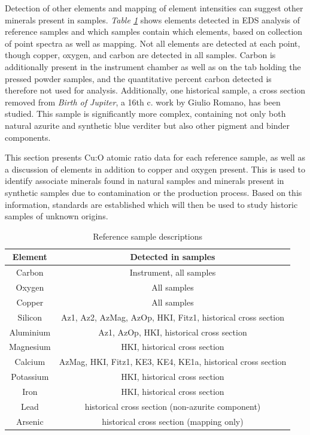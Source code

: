 Detection of other elements and mapping of element intensities can suggest other minerals present in samples. \textit{Table \ref{table:eds_elems}} shows elements detected in EDS analysis of reference samples and which samples contain which elements, based on collection of point spectra as well as mapping. Not all elements are detected at each point, though copper, oxygen, and carbon are detected in all samples. Carbon is additionally present in the instrument chamber as well as on the tab holding the pressed powder samples, and the quantitative percent carbon detected is therefore not used for analysis. Additionally, one historical sample, a cross section removed from \textit{Birth of Jupiter}, a 16th c. work by Giulio Romano, has been studied. This sample is significantly more complex, containing not only both natural azurite and synthetic blue verditer but also other pigment and binder components.

This section presents Cu:O atomic ratio data for each reference sample, as well as a discussion of elements in addition to copper and oxygen present. This is used to identify associate minerals found in natural samples and minerals present in synthetic samples due to contamination or the production process. Based on this information, standards are established which will then be used to study historic samples of unknown origins.

\begin{table}[H]
\caption{Reference sample descriptions}
\centering
\label{table:eds_elems}
\begin{tabular}{c c}
\toprule
Element & Detected in samples \\
\midrule
Carbon & Instrument, all samples \\
Oxygen & All samples \\
Copper & All samples \\
Silicon & Az1, Az2, AzMag, AzOp, HKI, Fitz1, historical cross section \\
Aluminium & Az1, AzOp, HKI, historical cross section \\
Magnesium & HKI, historical cross section \\
Calcium & AzMag, HKI, Fitz1, KE3, KE4, KE1a, historical cross section \\
Potassium & HKI, historical cross section \\
Iron & HKI, historical cross section \\
Lead & historical cross section (non-azurite component) \\
Arsenic & historical cross section (mapping only) \\
\bottomrule
\end{tabular}
\end{table}


